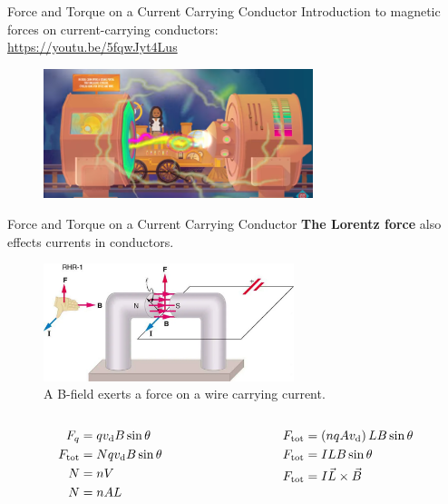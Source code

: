 \documentclass{beamer}
\begin{document}
\begin{frame}{Force and Torque on a Current Carrying Conductor}
Introduction to magnetic forces on current-carrying conductors: \\ \vspace{0.5cm}
\url{https://youtu.be/5fqwJyt4Lus} \\
\begin{figure}
\centering
\includegraphics[width=0.7\textwidth]{figures/pbs.png}
\end{figure}
\end{frame}

\begin{frame}{Force and Torque on a Current Carrying Conductor}
\textbf{\alert{The Lorentz force}} also effects currents in conductors.
\begin{figure}
\centering
\includegraphics[width=0.65\textwidth]{figures/lorentz_wire.png}
\caption{\label{fig:lorentz_wire} \footnotesize A B-field exerts a force on a wire carrying current.}
\end{figure}
\scriptsize
\begin{columns}[T]
\begin{column}{0.5\textwidth}
\begin{align}
F_q &= q v_{\rm d} B \sin\theta \\
F_{\rm tot} &= N q v_{\rm d} B \sin\theta \\
N &= nV \\
N & = n A L
\end{align}
\end{column}
\begin{column}{0.5\textwidth}
\begin{align}
F_{\rm tot} &= \left(n q A v_{\rm d}\right) L B \sin\theta \\
F_{\rm tot} &= I L B \sin\theta \\
F_{\rm tot} &= I \vec{L} \times \vec{B}
\end{align}
\end{column}
\end{columns}
\end{frame}
\end{document}
